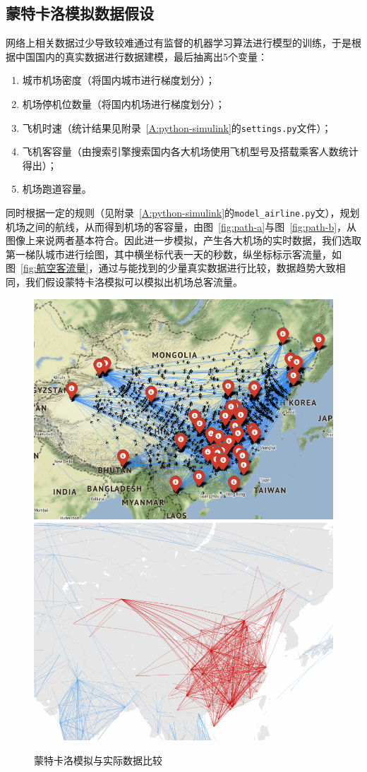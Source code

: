 \subsection{蒙特卡洛模拟数据假设}
网络上相关数据过少导致较难通过有监督的机器学习算法进行模型的训练，于是根据中国国内的真实数据进行数据建模，最后抽离出5个变量：
\begin{enumerate}
    \item 城市机场密度（将国内城市进行梯度划分）\cite{modood2018administrative}；
    \item 机场停机位数量（将国内机场进行梯度划分）\cite{Pentadiine2019机场}；
    \item 飞机时速（统计结果见附录~\ref{A:python-simulink}的\texttt{settings.py}文件）；
    \item 飞机客容量（由搜索引擎搜索国内各大机场使用飞机型号及搭载乘客人数统计得出）；
    \item 机场跑道容量\cite{wou2018跑道容量}。
\end{enumerate}

同时根据一定的规则（见附录~\ref{A:python-simulink}的\texttt{model\_airline.py}文），规划机场之间的航线，从而得到机场的客容量，由图~\ref{fig:path-a}与图~\ref{fig:path-b}，从图像上来说两者基本符合。因此进一步模拟，产生各大机场的实时数据，我们选取第一梯队城市进行绘图，其中横坐标代表一天的秒数，纵坐标标示客流量，如图~\ref{fig:航空客流量}，通过与能找到的少量真实数据进行比较，数据趋势大致相同，我们假设蒙特卡洛模拟可以模拟出机场总客流量。

\begin{figure}
    \centering
        {\includegraphics[width=.7\textwidth]{figures/path_python.png}} \\
        {\includegraphics[width=.7\textwidth]{figures/path_variflight.png}}
    \caption{蒙特卡洛模拟与实际数据比较}\label{fig:path}
\end{figure}

